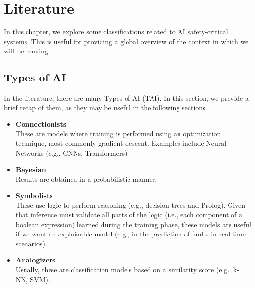 \chapter{Literature}
In this chapter, we explore some classifications related to AI safety-critical systems. This is useful for providing a global overview of the context in which we will be moving.

\section{Types of AI}
\label{sec:TAI}
In the literature, there are many Types of AI (TAI). In this section, we provide a brief recap of them, as they may be useful in the following sections.
\begin{itemize}
    \item \textbf{Connectionists} \\
    These are models where training is performed using an optimization technique, most commonly gradient descent. Examples include Neural Networks (e.g., CNNs, Transformers).
    \item \textbf{Bayesian} \\
        Results are obtained in a probabilistic manner.
    \item \textbf{Symbolists} \\
        These use logic to perform reasoning (e.g., decision trees and Prolog). Given that inference must validate all parts of the logic (i.e., each component of a boolean expression) learned during the training phase, these models are useful if we want an explainable model (e.g., in the \href{https://github.com/edoardosarri24/violation-prediction-in-realtime-system}{prediction of faults} in real-time scenarios).
    \item \textbf{Analogizers} \\
        Usually, these are classification models based on a similarity score (e.g., k-NN, SVM).
\end{itemize}

